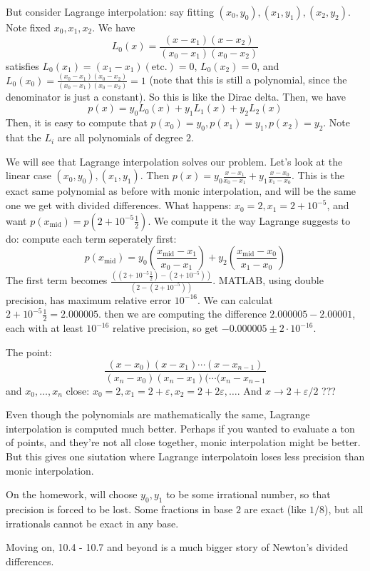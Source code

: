 \documentclass{article}
\theoremstyle{plain}
\theoremstyle{remark}
\newcommand{\ep}{{\varepsilon}}
\begin{document}
But consider Lagrange interpolation:
say fitting $(x_0, y_0), (x_1,y_1), (x_2,y_2)$.
Note fixed $x_0,x_1,x_2$.
We have
\[
	L_0(x) = \frac{(x-x_1)(x-x_2)}{(x_0-x_1)(x_0-x_2)}
\]
satisfies $L_0(x_1) = (x_1 - x_1)(\text{etc.}) = 0$,
$L_0(x_2) = 0$, and $L_0(x_0) = \frac{(x_0-x_1)(x_0-x_2)}{(x_0-x_1)(x_0-x_2)} = 1$
(note that this is still a polynomial, since the denominator is just a constant).
So this is like the Dirac delta.
Then, we have
\[
	p(x) = y_0 L_0(x) + y_1L_1(x) + y_2L_2(x)
\]
Then, it is easy to compute that $p(x_0) = y_0, p(x_1) = y_1, p(x_2) = y_2$.
Note that the $L_i$ are all polynomials of degree $2$.

We will see that Lagrange interpolation solves our problem.
Let's look at the linear case $(x_0,y_0),(x_1,y_1)$.
Then $p(x) = y_0\frac{x-x_1}{x_0-x_1} + y_1\frac{x-x_0}{x_1-x_0}$.
This is the exact same polynomial as before with monic interpolation,
and will be the same one we get with divided differences.
What happens: $x_0 = 2, x_1 = 2 + 10^{-5}$, and want
$p(x_{\text{mid}}) = p(2 + 10^{-5}\frac12)$.
We compute it the way Lagrange suggests to do: compute each term seperately first:
\[
	p(x_{\text{mid}})
	= y_0\left(\frac{x_{\text{mid}} - x_1}{x_0 - x_1}\right) +
	y_2\left(\frac{x_{\text{mid}} - x_0}{x_1 - x_0}\right)
\]
The first term becomes $\frac{((2 + 10^{-5}\frac12) - (2+10^{-5}))}
{(2 - (2 + 10^{-5}))}$.
MATLAB, using double precision, has maximum relative error $10^{-16}$.
We can calculat $2 + 10^{-5}\frac12 = 2.000005$.
then we are computing the difference $2.000005 - 2.00001$,
each with at least $10^{-16}$ relative precision,
so get $-0.000005 \pm 2\cdot 10^{-16}$.

The point:
\[
	\frac{(x-x_0)(x-x_1)\cdots(x-x_{n-1})}{(x_n-x_0)(x_n-x_1)(\cdots(x_n-x_{n-1}}
\]
and $x_0,\dots,x_n$ close: $x_0 = 2, x_1 = 2 + \ep, x_2 = 2 + 2\ep,\dots$.
And $x \to 2 + \ep/2$ ???

Even though the polynomials are mathematically the same,
Lagrange interpolation is computed much better.
Perhaps if you wanted to evaluate a ton of points, and they're not all close together,
monic interpolation might be better.
But this gives one siutation where Lagrange interpolatoin
loses less precision than monic interpolation.

On the homework, will choose $y_0,y_1$ to be some irrational number,
so that precision is forced to be lost.
Some fractions in base $2$ are exact (like $1/8$), but all irrationals
cannot be exact in any base.

Moving on, 10.4 - 10.7 and beyond is a much bigger story
of Newton's divided differences.
\end{document}
